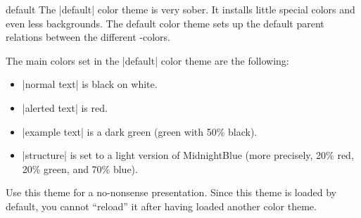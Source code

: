 \begin{colorthemeexample}{default}
  The |default| color theme is very sober. It installs little special colors and even less backgrounds. The default color theme sets up the default parent relations between the different \beamer-colors.

  The main colors set in the |default| color theme are the following:
  \begin{itemize}
  \item
    |normal text| is black on white.
  \item
    |alerted text| is red.
  \item
    |example text| is a dark green (green with 50\% black).
  \item
    |structure| is set to a light version of MidnightBlue (more precisely, 20\% red, 20\% green, and 70\% blue).
  \end{itemize}
  Use this theme for a no-nonsense presentation. Since this theme is loaded by default, you cannot ``reload'' it after having loaded another color theme.
\end{colorthemeexample}

